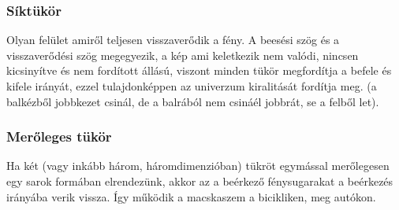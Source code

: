 \documentclass{article}
\begin{document}
\subsubsection{Síktükör}
Olyan felület amiről teljesen visszaverődik a fény. A beesési szög és a visszaverődési szög megegyezik, a kép ami keletkezik  nem valódi, nincsen kicsinyítve és nem fordított állású, viszont minden tükör megfordítja a befele és kifele irányát, ezzel tulajdonképpen az univerzum kiralitását fordítja meg. (a balkézből jobbkezet csinál, de a balrából nem csináél jobbrát, se a felből let). 
\subsubsection{Merőleges tükör}
Ha két (vagy inkább három, háromdimenzióban) tükröt egymással merőlegesen egy sarok formában elrendezünk, akkor az a beérkező fénysugarakat a beérkezés irányába verik vissza. Így működik a macskaszem a bicikliken, meg autókon.
\end{document}
